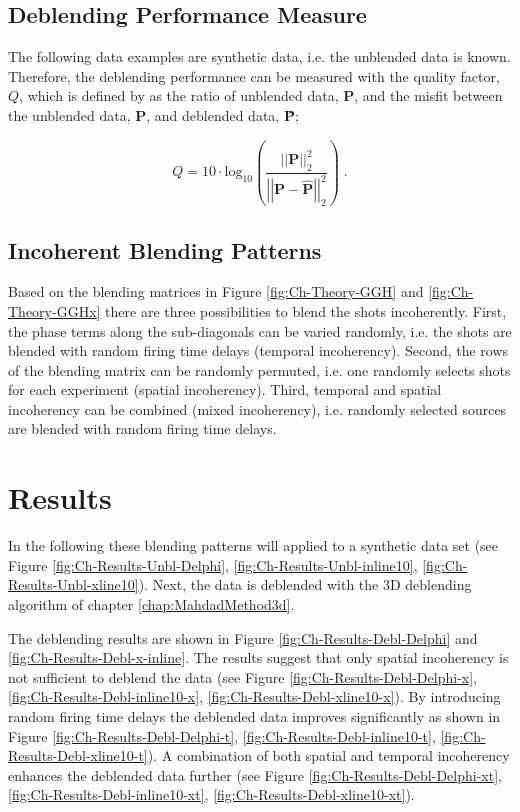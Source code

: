\subsection*{Deblending Performance Measure}

The following data examples are synthetic data, i.e. the unblended data is known. Therefore, the deblending performance can be measured with the quality factor, $Q$, which is defined by \citet{IbrahimQuality} as the ratio of unblended data, $\mathbf{P}$, and the misfit between the unblended data, $\mathbf{P}$, and deblended data, \textbf{\^{P}};

\begin{equation}
	Q = 10 \cdot \mathrm{log_{10}} \left( \frac{\left|\left|\mathbf{P}\right|\right| _2 ^2}{\left|\left|\mathbf{P - \hat{P}}\right|\right| _2 ^2} \right) \;.	
\end{equation}


\subsection*{Incoherent Blending Patterns}

Based on the blending matrices in Figure \ref{fig:Ch-Theory-GGH} and \ref{fig:Ch-Theory-GGHx} there are three possibilities to blend the shots incoherently. First, the phase terms along the sub-diagonals can be varied randomly, i.e. the shots are blended with random firing time delays (temporal incoherency). Second, the rows of the blending matrix can be randomly permuted, i.e. one randomly selects shots for each experiment (spatial incoherency). Third, temporal and spatial incoherency can be combined (mixed incoherency), i.e. randomly selected sources are blended with random firing time delays.



\section{Results}

In the following these blending patterns will applied to a synthetic data set (see Figure \ref{fig:Ch-Results-Unbl-Delphi}, \ref{fig:Ch-Results-Unbl-inline10}, \ref{fig:Ch-Results-Unbl-xline10}). Next, the data is deblended with the 3D deblending algorithm of chapter \ref{chap:MahdadMethod3d}. 

The deblending results are shown in Figure \ref{fig:Ch-Results-Debl-Delphi} and \ref{fig:Ch-Results-Debl-x-inline}. The results suggest that only spatial incoherency is not sufficient to deblend the data (see Figure \ref{fig:Ch-Results-Debl-Delphi-x}, \ref{fig:Ch-Results-Debl-inline10-x}, \ref{fig:Ch-Results-Debl-xline10-x}). By introducing random firing time delays the deblended data improves significantly as shown in Figure \ref{fig:Ch-Results-Debl-Delphi-t}, \ref{fig:Ch-Results-Debl-inline10-t}, \ref{fig:Ch-Results-Debl-xline10-t}). A combination of both spatial and temporal incoherency enhances the deblended data further (see Figure \ref{fig:Ch-Results-Debl-Delphi-xt}, \ref{fig:Ch-Results-Debl-inline10-xt}, \ref{fig:Ch-Results-Debl-xline10-xt}).

